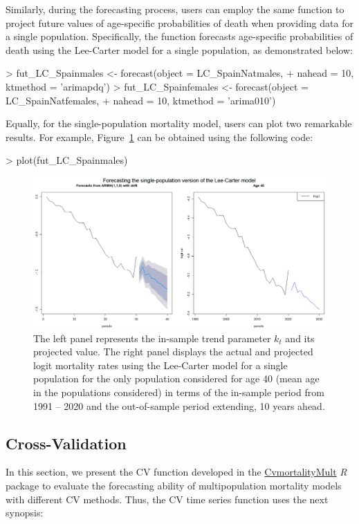 Similarly, during the forecasting process, users can employ the same function to project future values of age-specific probabilities of death when providing data for a single population. Specifically, the function forecasts age-specific probabilities of death using the Lee-Carter model for a single population, as demonstrated below:
%
\begin{example}
> fut_LC_Spainmales <- forecast(object = LC_SpainNatmales,
+	nahead = 10, ktmethod = 'arimapdq')
> fut_LC_Spainfemales <- forecast(object = LC_SpainNatfemales,
+	nahead = 10, ktmethod = 'arima010')
\end{example}

Equally, for the single-population mortality model, users can plot two remarkable results. For example, Figure~\ref{ForecastLC} can be obtained using the following code:
%
\begin{example}
> plot(fut_LC_Spainmales)
\end{example}
%

\begin{figure}[h!]
\centering
\includegraphics*[width=\textwidth]{ForecastLC.png}
\caption{The left panel represents the in-sample trend parameter $k_t$ and its projected value. The right panel displays the actual and projected logit mortality rates using the Lee-Carter model for a single population for the only population considered for age 40 (mean age in the populations considered) in terms of the in-sample period from 1991 – 2020 and the out-of-sample period extending, 10 years ahead.}
\label{ForecastLC}
\end{figure}

\subsection{Cross-Validation}

In this section, we present the CV function developed in the \href{https://cran.r-project.org/web/packages/CvmortalityMult/index.html}{CvmortalityMult} \emph{R} package to evaluate the forecasting ability of multipopulation mortality models with different CV methods. Thus, the CV time series function uses the next synopsis:

